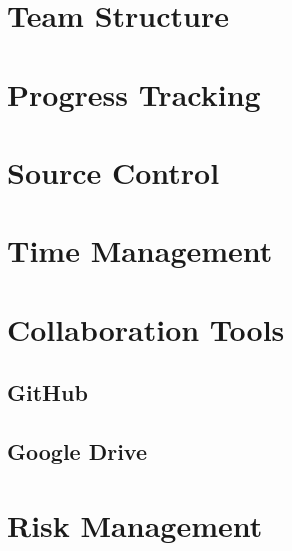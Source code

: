 \section{Team Structure}
\section{Progress Tracking}
\section{Source Control}
\section{Time Management}
\section{Collaboration Tools}
	\subsection{GitHub}
	\subsection{Google Drive}
\section{Risk Management}